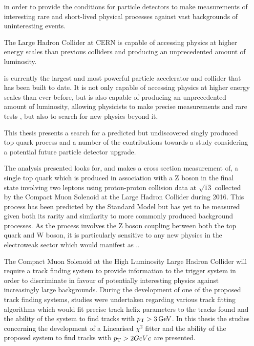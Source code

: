 in order to provide the conditions for particle detectors to make measurements of interesting rare and short-lived physical processes against vast backgrounds of uninteresting events.

The Large Hadron Collider at CERN is 
capable of accessing physics at higher energy scales than previous colliders and producing an unprecedented amount of luminosity.


is currently the largest and most powerful particle accelerator and collider that has been built to date.
It is not only capable of accessing physics at higher energy scales than ever before, but is also capable of producing an unprecedented amount of luminosity, allowing physicists to make precise measurements and rare tests 
, but also to search for new physics beyond it.


This thesis presents a search for a predicted but undiscovered singly produced top quark process and a number of the contributions towards a study considering a potential future particle detector upgrade.

The analysis presented looks for, and makes a cross section measurement of, a single top quark which is produced in association with a Z boson in the final state involving two leptons using proton-proton collision data at $\sqrt{13}$ collected by the Compact Muon Solenoid at the Large Hadron Collider during 2016.
This process has been predicted by the Standard Model but has yet to be measured given both its rarity and similarity to more commonly produced background processes.
As the process involves the Z boson coupling between both the top quark and W boson, it is particularly sensitive to any new physics in the electroweak sector which would manifest as ..

The Compact Muon Solenoid at the High Luminosity Large Hadron Collider will require a track finding system to provide information to the trigger system in order to discriminate in favour of potentially interesting physics against increasingly large backgrounds.
During the development of one of the proposed track finding systems, studies were undertaken regarding various track fitting algorithms which would fit precise track helix parameters to the tracks found and the ability of the system to find tracks with $p_{\mathrm{T}} > 3\,\text{Ge\hspace{-.08em}V}$.
In this thesis the studies concerning the development of a Linearised $\chi^{2}$ fitter and the ability of the proposed system to find tracks with $p_{\mathrm{T}} > 2GeVc$ are presented.
